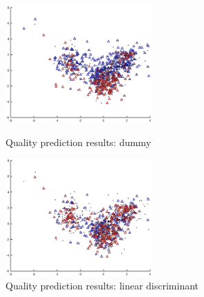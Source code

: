 \documentclass[twoside]{article}
\begin{document}
\begin{multicols}{2}
\begin{figure}[H]
\centering
\includegraphics[width=0.5\textwidth]{rankpca/dummy}
\caption{Quality prediction results: dummy}
\includegraphics[width=0.5\textwidth]{rankpca/lindiscr}
\caption{Quality prediction results: linear discriminant}
\end{figure}


\end{multicols}
\end{document}
